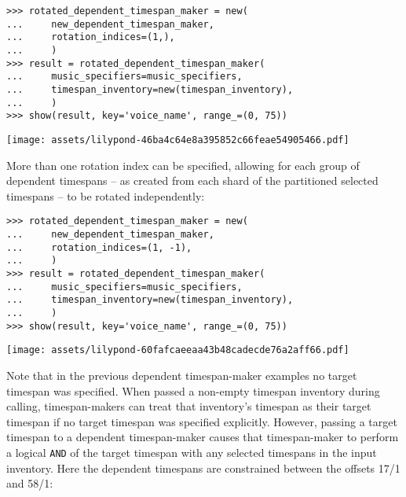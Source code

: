 \begin{abjadbookoutput}
\begin{singlespacing}
\vspace{-0.5\baselineskip}
\begin{lstlisting}
>>> rotated_dependent_timespan_maker = new(
...     new_dependent_timespan_maker,
...     rotation_indices=(1,),
...     )
>>> result = rotated_dependent_timespan_maker(
...     music_specifiers=music_specifiers,
...     timespan_inventory=new(timespan_inventory),
...     )
>>> show(result, key='voice_name', range_=(0, 75))
\end{lstlisting}
\noindent\texttt{[image: assets/lilypond-46ba4c64e8a395852c66feae54905466.pdf]}
\end{singlespacing}
\end{abjadbookoutput}

\noindent More than one rotation index can be specified, allowing for each
group of dependent timespans -- as created from each shard of the partitioned
selected timespans -- to be rotated independently:

\begin{comment}
<abjad>
rotated_dependent_timespan_maker = new(
    new_dependent_timespan_maker,
    rotation_indices=(1, -1),
    )
result = rotated_dependent_timespan_maker(
    music_specifiers=music_specifiers,
    timespan_inventory=new(timespan_inventory),
    )
show(result, key='voice_name', range_=(0, 75))
</abjad>
\end{comment}

\begin{abjadbookoutput}
\begin{singlespacing}
\vspace{-0.5\baselineskip}
\begin{lstlisting}
>>> rotated_dependent_timespan_maker = new(
...     new_dependent_timespan_maker,
...     rotation_indices=(1, -1),
...     )
>>> result = rotated_dependent_timespan_maker(
...     music_specifiers=music_specifiers,
...     timespan_inventory=new(timespan_inventory),
...     )
>>> show(result, key='voice_name', range_=(0, 75))
\end{lstlisting}
\noindent\texttt{[image: assets/lilypond-60fafcaeeaa43b48cadecde76a2aff66.pdf]}
\end{singlespacing}
\end{abjadbookoutput}

\noindent Note that in the previous dependent timespan-maker examples no target
timespan was specified. When passed a non-empty timespan inventory during
calling, timespan-makers can treat that inventory's timespan as their target
timespan if no target timespan was specified explicitly. However, passing a
target timespan to a dependent timespan-maker causes that timespan-maker to
perform a logical \texttt{AND} of the target timespan with any selected
timespans in the input inventory. Here the dependent timespans are constrained
between the offsets 17/1 and 58/1:

